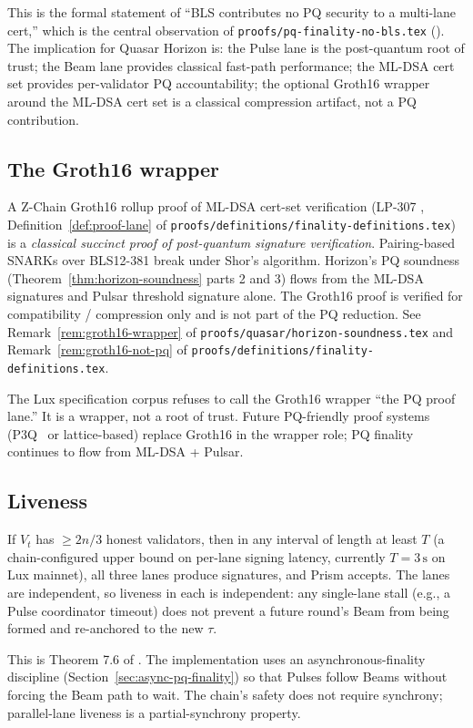 This is the formal statement of ``BLS contributes no PQ security to a multi-lane cert,'' which is the central observation of \texttt{proofs/pq-finality-no-bls.tex} (\cite{pqfinalitynobls}). The implication for Quasar Horizon is: the Pulse lane is the post-quantum root of trust; the Beam lane provides classical fast-path performance; the ML-DSA cert set provides per-validator PQ accountability; the optional Groth16 wrapper around the ML-DSA cert set is a classical compression artifact, not a PQ contribution.

\subsection{The Groth16 wrapper}

\begin{remark}
\label{rem:groth16-wrapper-horizon}
A Z-Chain Groth16 rollup proof of ML-DSA cert-set verification (LP-307 \cite{lp307}, Definition~\ref{def:proof-lane} of \texttt{proofs/definitions/finality-definitions.tex}) is a \emph{classical succinct proof of post-quantum signature verification}. Pairing-based SNARKs over BLS12-381 break under Shor's algorithm. Horizon's PQ soundness (Theorem~\ref{thm:horizon-soundness} parts 2 and 3) flows from the ML-DSA signatures and Pulsar threshold signature alone. The Groth16 proof is verified for compatibility / compression only and is not part of the PQ reduction. See Remark~\ref{rem:groth16-wrapper} of \texttt{proofs/quasar/horizon-soundness.tex} and Remark~\ref{rem:groth16-not-pq} of \texttt{proofs/definitions/finality-definitions.tex}.
\end{remark}

The Lux specification corpus refuses to call the Groth16 wrapper ``the PQ proof lane.'' It is a wrapper, not a root of trust. Future PQ-friendly proof systems (P3Q~\cite{luxp3q} or lattice-based) replace Groth16 in the wrapper role; PQ finality continues to flow from ML-DSA + Pulsar.

\subsection{Liveness}

\begin{theorem}
\label{thm:parallel-liveness}
If $V_t$ has $\geq 2n/3$ honest validators, then in any interval of length at least $T$ (a chain-configured upper bound on per-lane signing latency, currently $T = 3\,\mathrm{s}$ on Lux mainnet), all three lanes produce signatures, and Prism accepts. The lanes are independent, so liveness in each is independent: any single-lane stall (e.g., a Pulse coordinator timeout) does not prevent a future round's Beam from being formed and re-anchored to the new $\tau$.
\end{theorem}
This is Theorem 7.6 of \cite{quasarcertsoundness}. The implementation uses an asynchronous-finality discipline (Section~\ref{sec:async-pq-finality}) so that Pulses follow Beams without forcing the Beam path to wait. The chain's safety does not require synchrony; parallel-lane liveness is a partial-synchrony property.


